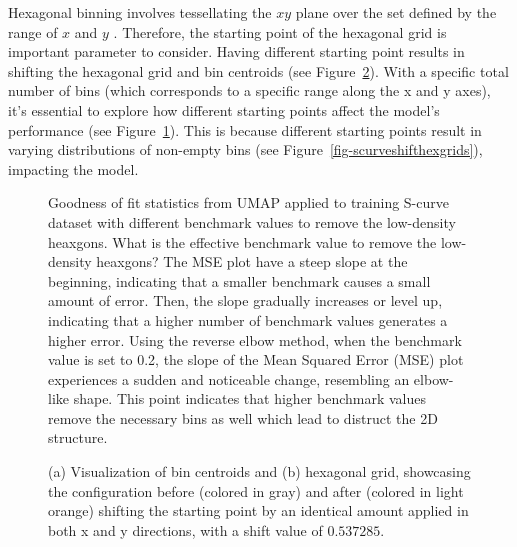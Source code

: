 \documentclass[
  12pt]{article}
\begin{document}
Hexagonal binning involves tessellating the \(xy\) plane over the set
defined by the range of \(x\) and \(y\) \citep{Dan2023}. Therefore, the
starting point of the hexagonal grid is important parameter to consider.
Having different starting point results in shifting the hexagonal grid
and bin centroids (see Figure~\ref{fig-scurveshifthexgridsexp}). With a
specific total number of bins (which corresponds to a specific range
along the x and y axes), it's essential to explore how different
starting points affect the model's performance (see
Figure~\ref{fig-mseScurvestartpoint}). This is because different
starting points result in varying distributions of non-empty bins (see
Figure~\ref{fig-scurveshifthexgrids}), impacting the model.

\begin{figure}[H]


\caption{\label{fig-mseScurvestartpoint}Goodness of fit statistics from
UMAP applied to training S-curve dataset with different benchmark values
to remove the low-density heaxgons. What is the effective benchmark
value to remove the low-density heaxgons? The MSE plot have a steep
slope at the beginning, indicating that a smaller benchmark causes a
small amount of error. Then, the slope gradually increases or level up,
indicating that a higher number of benchmark values generates a higher
error. Using the reverse elbow method, when the benchmark value is set
to 0.2, the slope of the Mean Squared Error (MSE) plot experiences a
sudden and noticeable change, resembling an elbow-like shape. This point
indicates that higher benchmark values remove the necessary bins as well
which lead to distruct the 2D structure.}

\end{figure}%

\begin{figure}[H]


\caption{\label{fig-scurveshifthexgridsexp}(a) Visualization of bin
centroids and (b) hexagonal grid, showcasing the configuration before
(colored in gray) and after (colored in light orange) shifting the
starting point by an identical amount applied in both x and y
directions, with a shift value of \(0.537285\).}

\end{figure}%
\end{document}
